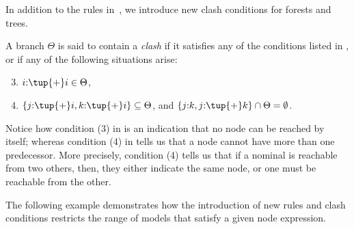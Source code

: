 
In addition to the rules in~, we introduce new clash conditions for forests and trees.

\begin{defi}\label{def:clashf}
    A branch $\Theta$ is said to contain a \emph{clash} if it satisfies any of the conditions listed in , or if any of the following situations arise:
    \begin{enumerate}
        \setcounter{enumi}{2}
        \item $i{:}\tup{+}i \in \Theta$, 
        \item $\{j{:}\tup{+} i, k{:}\tup{+} i\} \subseteq \Theta$, and $\{j{:}k,j{:}\tup{+}k\}\cap\Theta = \emptyset$. %
    \end{enumerate}
\end{defi}

Notice how condition (3) in  is an indication that no node can be reached by itself; whereas condition (4) in  tells us that a node cannot have more than one predecessor. 
More precisely, condition (4) tells us that if a nominal is reachable from two others, then, they either indicate the same node, or one must be reachable from the other.


The following example demonstrates how the introduction of new rules and clash conditions restricts the range of models that satisfy a given node expression.

